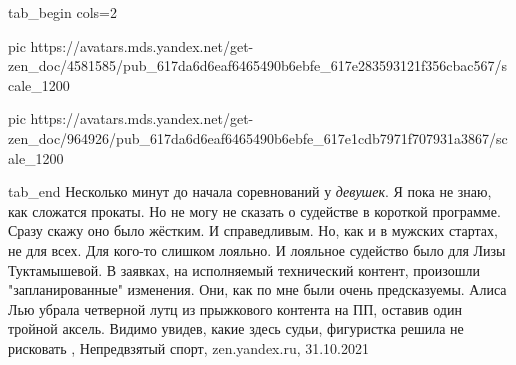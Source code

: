 \ifcmt
  tab_begin cols=2

     pic https://avatars.mds.yandex.net/get-zen_doc/4581585/pub_617da6d6eaf6465490b6ebfe_617e283593121f356cbac567/scale_1200

     pic https://avatars.mds.yandex.net/get-zen_doc/964926/pub_617da6d6eaf6465490b6ebfe_617e1cdb7971f707931a3867/scale_1200

  tab_end
\fi
Несколько минут до начала соревнований у \emph{девушек}. Я пока не знаю, как
сложатся прокаты. Но не могу не сказать о судействе в короткой программе. Сразу
скажу оно было жёстким. И справедливым. Но, как и в мужских стартах, не для
всех. Для кого-то слишком лояльно. И лояльное судейство было для Лизы
Туктамышевой.  В заявках, на исполняемый технический контент, произошли
"запланированные" изменения. Они, как по мне были очень предсказуемы. Алиса Лью
убрала четверной лутц из прыжкового контента на ПП, оставив один тройной
аксель. Видимо увидев, какие здесь судьи, фигуристка решила не рисковать
, 
Непредвзятый спорт, zen.yandex.ru, 31.10.2021
